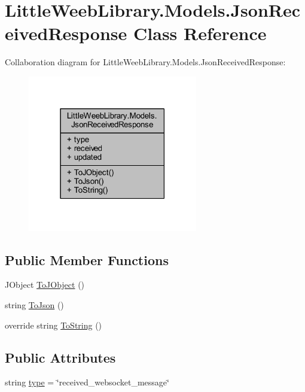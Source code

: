 \hypertarget{class_little_weeb_library_1_1_models_1_1_json_received_response}{}\section{Little\+Weeb\+Library.\+Models.\+Json\+Received\+Response Class Reference}
\label{class_little_weeb_library_1_1_models_1_1_json_received_response}


Collaboration diagram for Little\+Weeb\+Library.\+Models.\+Json\+Received\+Response\+:\nopagebreak
\begin{figure}[H]
\begin{center}
\leavevmode
\includegraphics[width=210pt]{class_little_weeb_library_1_1_models_1_1_json_received_response__coll__graph}
\end{center}
\end{figure}
\subsection*{Public Member Functions}
\begin{DoxyCompactItemize}
\item 
J\+Object \mbox{\hyperlink{class_little_weeb_library_1_1_models_1_1_json_received_response_a415c10f87514185eebe1d911be1f32d2}{To\+J\+Object}} ()
\item 
string \mbox{\hyperlink{class_little_weeb_library_1_1_models_1_1_json_received_response_abed77a236608efb9bf777a44e6d2361b}{To\+Json}} ()
\item 
override string \mbox{\hyperlink{class_little_weeb_library_1_1_models_1_1_json_received_response_a396aa50a773bcd751e23cc7d61db34be}{To\+String}} ()
\end{DoxyCompactItemize}
\subsection*{Public Attributes}
\begin{DoxyCompactItemize}
\item 
string \mbox{\hyperlink{class_little_weeb_library_1_1_models_1_1_json_received_response_af28532db4b071f09d3f5c332d98ac470}{type}} = \char`\"{}received\+\_\+websocket\+\_\+message\char`\"{}
\end{DoxyCompactItemize}
